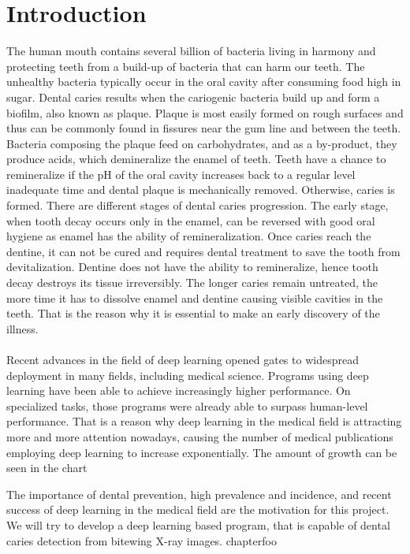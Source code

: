 \section{Introduction}
The human mouth contains several billion of bacteria living in harmony and protecting teeth from a build-up of bacteria that can harm our teeth. The unhealthy bacteria typically occur in the oral cavity after consuming food high in sugar. Dental caries results when the cariogenic bacteria build up and form a biofilm, also known as plaque. Plaque is most easily formed on rough surfaces and thus can be commonly found in fissures near the gum line and between the teeth. Bacteria composing the plaque feed on carbohydrates, and as a by-product, they produce acids, which demineralize the enamel of teeth. Teeth have a chance to remineralize if the pH of the oral cavity increases back to a regular level inadequate time and dental plaque is mechanically removed. Otherwise, caries is formed. There are different stages of dental caries progression. The early stage, when tooth decay occurs only in the enamel, can be reversed with good oral hygiene as enamel has the ability of remineralization. Once caries reach the dentine, it can not be cured and requires dental treatment to save the tooth from devitalization. Dentine does not have the ability to remineralize, hence tooth decay destroys its tissue irreversibly. The longer caries remain untreated, the more time it has to dissolve enamel and dentine causing visible cavities in the teeth. That is the reason why it is essential to make an early discovery of the illness. \\
\\
Recent advances in the field of deep learning opened gates to widespread deployment in many fields, including medical science. Programs using deep learning have been able to achieve increasingly higher performance. On specialized tasks, those programs were already able to surpass human-level performance. That is a reason why  deep learning in the medical field is attracting more and more attention nowadays, causing the number of medical publications employing deep learning to increase exponentially. The amount of growth can be seen in the chart

The importance of dental prevention, high prevalence and incidence, and recent success of deep learning in the medical field are the motivation for this project. We will try to develop a deep learning based program, that is capable of dental caries detection from bitewing X-ray images.
chapter{foo}